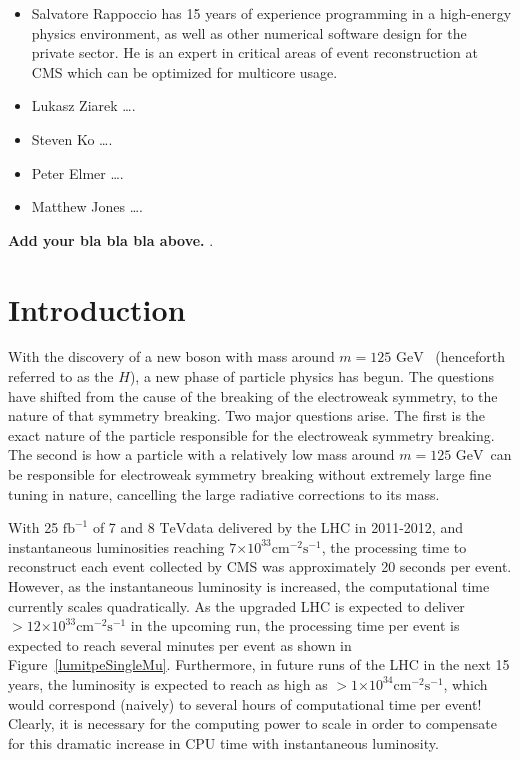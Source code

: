 \documentclass[12pt]{article}
\newcommand{\GeV}{\ensuremath{\mathrm{GeV}}}
\newcommand{\TeV}{\ensuremath{\mathrm{TeV}}}
\newcommand{\fbinv}        {\ensuremath{\mathrm{fb}^{-1}}}
\newcommand{\instlumiA}     {\ensuremath{\times 10^{33} \mathrm{cm}^{-2} \mathrm{s}^{-1}}}
\newcommand{\instlumiB}     {\ensuremath{\times 10^{34} \mathrm{cm}^{-2} \mathrm{s}^{-1}}}
\begin{document}
\begin{itemize}
\item Salvatore Rappoccio has 15 years of experience programming in a
high-energy physics environment, as well as other numerical software
design for the private sector. He is an expert in critical
areas of event reconstruction at CMS which can be optimized for
multicore usage. 
\item Lukasz Ziarek \ldots. 
\item Steven Ko \ldots. 
\item Peter Elmer \ldots.  
\item Matthew Jones \ldots.  
\end{itemize}




\bigskip

{\bf Add your bla bla bla above. }. 


\clearpage

\section{Introduction}

With the discovery of a new boson with mass around $m=125$
\GeV ~\cite{higgs_cms,higgs_atlas} (henceforth referred to as the
$H$), a new phase of particle physics
has begun. The questions have shifted from the cause of the breaking
of the electroweak symmetry, to the nature of that symmetry
breaking. Two major questions arise. The first is the exact nature of
the particle responsible for the electroweak symmetry breaking. The
second is how a particle with a relatively low mass around $m=125$ \GeV\ 
can be responsible for electroweak symmetry breaking 
without extremely large fine tuning in nature, cancelling
the large radiative corrections to its mass. 

With 25 $\fbinv$ of 7 and 8 \TeV data delivered by the LHC in
2011-2012, and instantaneous luminosities reaching
$7\instlumiA$, the processing
time to reconstruct each event collected by CMS was approximately 20
seconds per event. However, as the instantaneous luminosity is
increased, the computational time currently scales quadratically. As
the upgraded LHC is expected to deliver $>12\instlumiA$ in the
upcoming run, the processing time per event is expected to reach
several minutes per event as shown in
Figure~\ref{lumitpeSingleMu}. Furthermore, in future runs of the LHC
in the next 15 years, the luminosity is expected to reach as high as
$>1\instlumiB$, which would correspond (naively) to several hours of
computational time per event! Clearly, it is necessary for the
computing power to scale in order to compensate for this dramatic
increase in CPU time with instantaneous luminosity. 
\end{document}
